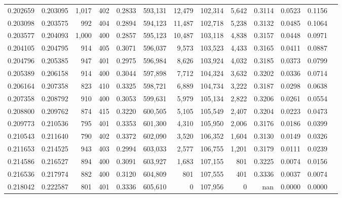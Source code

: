 \begin{tabular}{rrrrrrrrrrrrr}
0.202659 & 0.203095 & 1,017 & 402 &                                     0.2833 & 593,131 &  12,479 & 102,314 &   5,642 & 0.3114 & 0.0523 & 0.1156 \\
0.203098 & 0.203575 &   992 & 404 &                                     0.2894 & 594,123 &  11,487 & 102,718 &   5,238 & 0.3132 & 0.0485 & 0.1064 \\
0.203577 & 0.204093 & 1,000 & 400 &                                     0.2857 & 595,123 &  10,487 & 103,118 &   4,838 & 0.3157 & 0.0448 & 0.0971 \\
0.204105 & 0.204795 &   914 & 405 &                                     0.3071 & 596,037 &   9,573 & 103,523 &   4,433 & 0.3165 & 0.0411 & 0.0887 \\
0.204796 & 0.205385 &   947 & 401 &                                     0.2975 & 596,984 &   8,626 & 103,924 &   4,032 & 0.3185 & 0.0373 & 0.0799 \\
0.205389 & 0.206158 &   914 & 400 &                                     0.3044 & 597,898 &   7,712 & 104,324 &   3,632 & 0.3202 & 0.0336 & 0.0714 \\
0.206164 & 0.207358 &   823 & 410 &                                     0.3325 & 598,721 &   6,889 & 104,734 &   3,222 & 0.3187 & 0.0298 & 0.0638 \\
0.207358 & 0.208792 &   910 & 400 &                                     0.3053 & 599,631 &   5,979 & 105,134 &   2,822 & 0.3206 & 0.0261 & 0.0554 \\
0.208800 & 0.209762 &   874 & 415 &                                     0.3220 & 600,505 &   5,105 & 105,549 &   2,407 & 0.3204 & 0.0223 & 0.0473 \\
0.209773 & 0.210536 &   795 & 401 &                                     0.3353 & 601,300 &   4,310 & 105,950 &   2,006 & 0.3176 & 0.0186 & 0.0399 \\
0.210543 & 0.211640 &   790 & 402 &                                     0.3372 & 602,090 &   3,520 & 106,352 &   1,604 & 0.3130 & 0.0149 & 0.0326 \\
0.211653 & 0.214525 &   943 & 403 &                                     0.2994 & 603,033 &   2,577 & 106,755 &   1,201 & 0.3179 & 0.0111 & 0.0239 \\
0.214586 & 0.216527 &   894 & 400 &                                     0.3091 & 603,927 &   1,683 & 107,155 &     801 & 0.3225 & 0.0074 & 0.0156 \\
0.216536 & 0.217974 &   882 & 400 &                                     0.3120 & 604,809 &     801 & 107,555 &     401 & 0.3336 & 0.0037 & 0.0074 \\
0.218042 & 0.222587 &   801 & 401 &                                     0.3336 & 605,610 &       0 & 107,956 &       0 &    nan & 0.0000 & 0.0000 \\
\bottomrule
\end{tabular}
